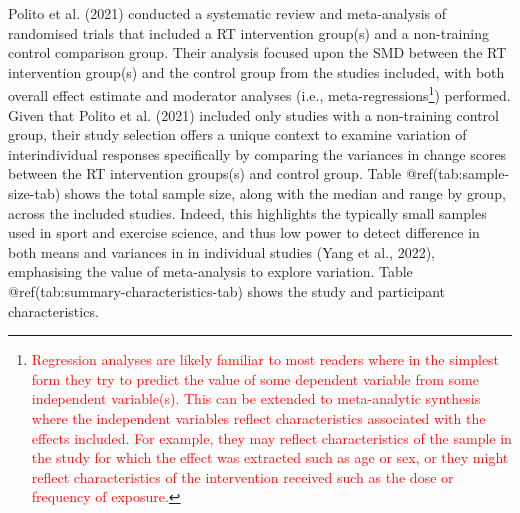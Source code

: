 \documentclass[
]{article}
\begin{document}
Polito et al. (2021) conducted a systematic review and meta-analysis of randomised trials that included a RT intervention group(s) and a non-training control comparison group. Their analysis focused upon the SMD between the RT intervention group(s) and the control group from the studies included, with both overall effect estimate and moderator analyses (i.e., meta-regressions\footnote{\textcolor{red}{Regression analyses are likely familiar to most readers where in the simplest form they try to predict the value of some dependent variable from some independent variable(s). This can be extended to meta-analytic synthesis where the independent variables reflect characteristics associated with the effects included. For example, they may reflect characteristics of the sample in the study for which the effect was extracted such as age or sex, or they might reflect characteristics of the intervention received such as the dose or frequency of exposure.}}) performed. Given that Polito et al. (2021) included only studies with a non-training control group, their study selection offers a unique context to examine variation of interindividual responses specifically by comparing the variances in change scores between the RT intervention groups(s) and control group. Table @ref(tab:sample-size-tab) shows the total sample size, along with the median and range by group, across the included studies. Indeed, this highlights the typically small samples used in sport and exercise science, and thus low power to detect difference in both means and variances in in individual studies (Yang et al., 2022), emphasising the value of meta-analysis to explore variation. Table @ref(tab:summary-characteristics-tab) shows the study and participant characteristics.
\end{document}

